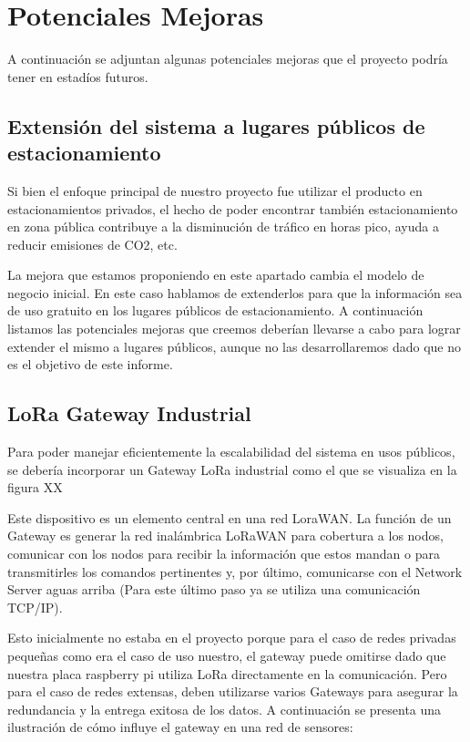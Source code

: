 \clearpage
\section{Potenciales Mejoras}
A continuación se adjuntan algunas potenciales mejoras que el proyecto podría tener en estadíos futuros.

\subsection{Extensión del sistema a lugares públicos de estacionamiento}

Si bien el enfoque principal de nuestro proyecto fue utilizar el producto en estacionamientos privados, el hecho de poder encontrar también estacionamiento en zona pública contribuye a la disminución de tráfico en horas pico, ayuda a reducir emisiones de CO2, etc. 

La mejora que estamos proponiendo en este apartado cambia el modelo de negocio inicial. En este caso hablamos de extenderlos para que la información sea de uso gratuito en los lugares públicos de estacionamiento. A continuación listamos las potenciales mejoras que creemos deberían llevarse a cabo para lograr extender el mismo a lugares públicos, aunque no las desarrollaremos dado que no es el objetivo de este informe.

\subsection{LoRa Gateway Industrial}
Para poder manejar eficientemente la escalabilidad del sistema en usos públicos, se debería incorporar un Gateway LoRa industrial como el que se visualiza en la figura XX 


Este dispositivo es un elemento central en una red LoraWAN. La función de un Gateway es generar la red inalámbrica LoRaWAN para cobertura a los nodos, comunicar con los nodos para recibir la información que estos mandan o para transmitirles los comandos pertinentes y, por último, comunicarse con el Network Server aguas arriba (Para este último paso ya se utiliza una comunicación TCP/IP). 

Esto inicialmente no estaba en el proyecto porque para el caso de redes privadas pequeñas como era el caso de uso nuestro, el gateway puede omitirse dado que nuestra placa raspberry pi utiliza LoRa directamente en la comunicación. Pero para el caso de redes extensas, deben utilizarse varios Gateways para asegurar la redundancia y la entrega exitosa de los datos. A continuación se presenta una ilustración de cómo influye el gateway en una red de sensores: 

